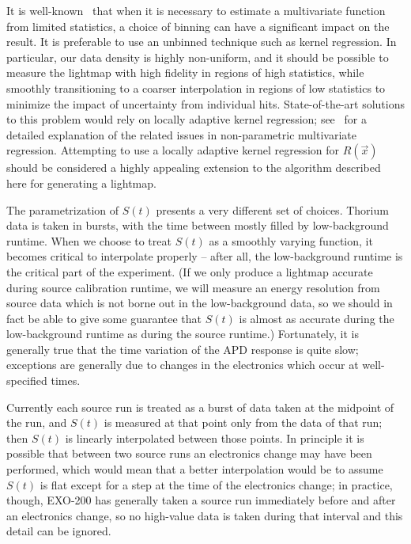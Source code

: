 It is well-known~\cite{MultivariateDensityScott} that when it is necessary to estimate a multivariate function from limited statistics, a choice of binning can have a significant impact on the result.  It is preferable to use an unbinned technique such as kernel regression.  In particular, our data density is highly non-uniform, and it should be possible to measure the lightmap with high fidelity in regions of high statistics, while smoothly transitioning to a coarser interpolation in regions of low statistics to minimize the impact of uncertainty from individual hits.  State-of-the-art solutions to this problem would rely on locally adaptive kernel regression; see~\cite{MultivariateDensityScott} for a detailed explanation of the related issues in non-parametric multivariate regression.  Attempting to use a locally adaptive kernel regression for $R(\vec{x})$ should be considered a highly appealing extension to the algorithm described here for generating a lightmap.

The parametrization of $S(t)$ presents a very different set of choices.  Thorium data is taken in bursts, with the time between mostly filled by low-background runtime.  When we choose to treat $S(t)$ as a smoothly varying function, it becomes critical to interpolate properly -- after all, the low-background runtime is the critical part of the experiment.  (If we only produce a lightmap accurate during source calibration runtime, we will measure an energy resolution from source data which is not borne out in the low-background data, so we should in fact be able to give some guarantee that $S(t)$ is almost as accurate during the low-background runtime as during the source runtime.)  Fortunately, it is generally true that the time variation of the APD response is quite slow; exceptions are generally due to changes in the electronics which occur at well-specified times.

Currently each source run is treated as a burst of data taken at the midpoint of the run, and $S(t)$ is measured at that point only from the data of that run; then $S(t)$ is linearly interpolated between those points.  In principle it is possible that between two source runs an electronics change may have been performed, which would mean that a better interpolation would be to assume $S(t)$ is flat except for a step at the time of the electronics change; in practice, though, EXO-200 has generally taken a source run immediately before and after an electronics change, so no high-value data is taken during that interval and this detail can be ignored.

